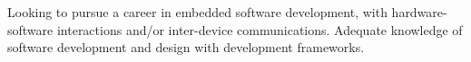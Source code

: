 %
%

\par{
Looking to pursue a career in embedded software development, with hardware-software interactions and/or inter-device communications. Adequate knowledge of software development and design with development frameworks.
}